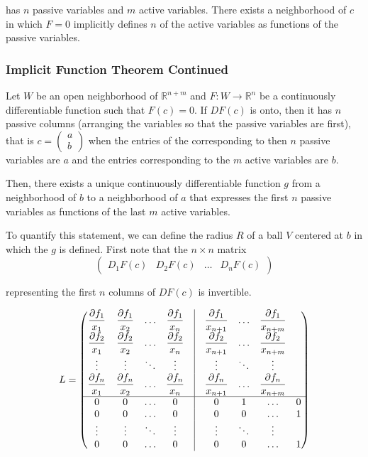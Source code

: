 \documentclass[11pt]{article}
\begin{document}
has $n$ passive variables and $m$ active variables. There exists a neighborhood of $c$ in which $F = 0$ implicitly defines $n$ of the active variables as functions of the passive variables. 

\subsubsection{Implicit Function Theorem Continued}
Let $W$ be an open neighborhood of $\mathbb{R}^{n+m}$ and $F : W \rightarrow \mathbb{R}^n$ be a continuously differentiable function such that $F(c) = 0$. If $DF(c)$ is onto, then it has $n$ passive columns (arranging the variables so that the passive variables are first), that is $c = \begin{pmatrix}
    a \\
    b
\end{pmatrix}$ when the entries of the corresponding to then $n$ passive variables are $a$ and the entries corresponding to the $m$ active variables are $b$.

Then, there exists a unique continuously differentiable function $g$ from a neighborhood of $b$ to a neighborhood of $a$ that expresses the first $n$ passive variables as functions of the last $m$ active variables.

To quantify this statement, we can define the radius $R$ of a ball $V$ centered at $b$ in which the $g$ is defined. First note that the $n \times n$ matrix 
\[
\begin{pmatrix}
    D_1 F(c) & D_2 F(c) & \ldots & D_n F(c)
\end{pmatrix}
\]

representing the first $n$ columns of $DF(c)$ is invertible. 

\[
L = \begin{pmatrix}
    \dfrac{\partial f_1}{x_1} & \dfrac{\partial f_1}{x_2} & \ldots & \dfrac{\partial f_1}{x_n} & \vline & \dfrac{\partial f_1}{x_{n+1}} & \ldots & \dfrac{\partial f_1}{x_{n+m}} \\
    \dfrac{\partial f_2}{x_1} & \dfrac{\partial f_2}{x_2} & \ldots & \dfrac{\partial f_2}{x_n} & \vline & \dfrac{\partial f_2}{x_{n+1}} & \ldots & \dfrac{\partial f_2}{x_{n+m}} \\
    \vdots & \vdots & \ddots & \vdots & \vline & \vdots & \ddots & \vdots \\
    \dfrac{\partial f_n}{x_1} & \dfrac{\partial f_n}{x_2} & \ldots & \dfrac{\partial f_n}{x_n} & \vline & \dfrac{\partial f_n}{x_{n+1}} & \ldots & \dfrac{\partial f_n}{x_{n+m}}\\
    \hline
    0 & 0 & \ldots & 0 & \vline & 0 & 1 & \ldots & 0 \\
    0 & 0 & \ldots & 0 & \vline & 0 & 0 & \ldots & 1 \\
    \vdots & \vdots & \ddots & \vdots & \vline & \vdots & \ddots & \vdots \\
    0 & 0 & \ldots & 0 & \vline & 0 & 0 & \ldots & 1
\end{pmatrix}
\]
\end{document}
